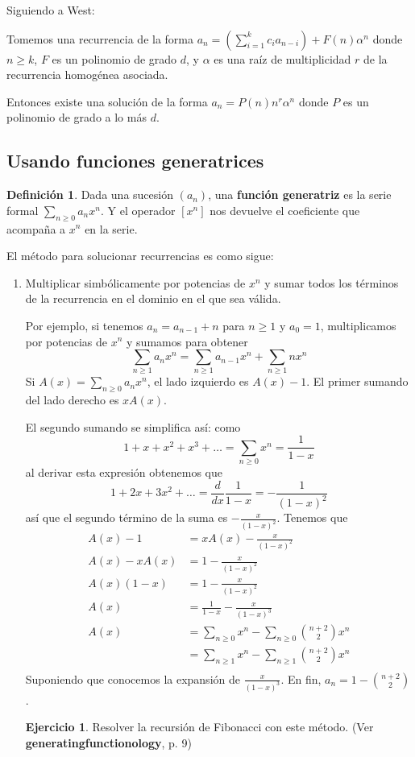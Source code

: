 \documentclass[spanish]{book}
\theoremstyle{definition}
\newtheorem*{defn}{Definición}
\newtheorem*{ejer}{Ejercicio}
\begin{document}
	Siguiendo a West:
	\begin{teo}
		Tomemos una recurrencia de la forma $a_n=(\sum_{i=1}^kc_ia_{n-i})+F(n)\alpha^n$ donde $n\geq k$, $F$ es un polinomio de grado $d$, y $\alpha$ es una raíz de multiplicidad $r$ de la recurrencia homogénea asociada.
		
		Entonces existe una solución de la forma $a_n=P(n)n^r\alpha^n$ donde $P$ es un polinomio de grado a lo más $d$.
	\end{teo}

\subsection{Usando funciones generatrices}\label{sec:res-rec-fg}
\begin{defn}
	Dada una sucesión $(a_n)$, una \textbf{función generatriz} es la serie formal $\sum_{n\geq0}a_nx^n$. Y el operador $[x^n]$ nos devuelve el coeficiente que acompaña a $x^n$ en la serie.
\end{defn}
El método para solucionar recurrencias es como sigue:
\begin{enumerate}
	\item Multiplicar simbólicamente por potencias de $x^n$ y sumar todos los términos de la recurrencia en el dominio en el que sea válida.
	
	Por ejemplo, si tenemos $a_n=a_{n-1}+n$ para $n\geq1$ y $a_0=1$, multiplicamos por potencias de $x^n$ y sumamos para obtener
	\[\sum_{n\geq1}a_nx^n=\sum_{n\geq 1}a_{n-1}x^n+\sum_{n\geq1}nx^n\]
	Si $A(x)=\sum_{n\geq0}a_nx^n$, el lado izquierdo es $A(x)-1$. El primer sumando del lado derecho es $xA(x)$.
	
	El segundo sumando se simplifica así: como
	 \[1+x+x^2+x^3+\ldots=\sum_{n\geq0}x^n=\frac{1}{1-x}\]
	al derivar esta expresión obtenemos que
	\[1+2x+3x^2+\ldots=\frac{d}{dx}\frac{1}{1-x}=-\frac{1}{(1-x)^2}\]
	así que el segundo término de la suma es $-\frac{x}{(1-x)^2}$. Tenemos que
	\begin{align*}
		A(x)-1&=xA(x)-\frac{x}{(1-x)^2}\\ A(x)-xA(x)&=1-\frac{x}{(1-x)^2}\\
		A(x)(1-x)&=1-\frac{x}{(1-x)^2}\\
		A(x)&=\frac{1}{1-x}-\frac{x}{(1-x)^3}\\
		A(x)&=\sum_{n\geq0}x^n-\sum_{n\geq0}{n+2\choose 2}x^n\\
		&=\sum_{n\geq1}x^n-\sum_{n\geq1}{n+2\choose 2}x^n\\
	\end{align*}
	Suponiendo que conocemos la expansión de $\frac{x}{(1-x)^3}$. En fin, $a_n=1-{n+2\choose 2}$.
	\begin{ejer}
		Resolver la recursión de Fibonacci con este método. (Ver \textbf{generatingfunctionology}, p. 9)
	\end{ejer}
	
\end{enumerate}
\end{document}
